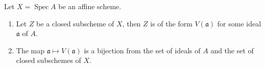 \documentclass[12pt]{book}
\theoremstyle{definition}
\DeclareMathOperator{\Spec}{Spec}
\begin{document}
%		
	
	\begin{proposition}
		Let $X = \Spec A$ be an affine scheme. 
		\begin{enumerate}
			\item Let $Z$ be a closed subscheme of $X$, then $Z$ is of the form $V(\mathfrak{a})$ for some ideal $\mathfrak{a}$ of $A$.
			
			\item The map $\mathfrak{a} \mapsto V(\mathfrak{a})$ is a bijection from the set of ideals of $A$ and the set of closed subschemes of $X$.
		\end{enumerate}
	\end{proposition}
	
\end{document}

